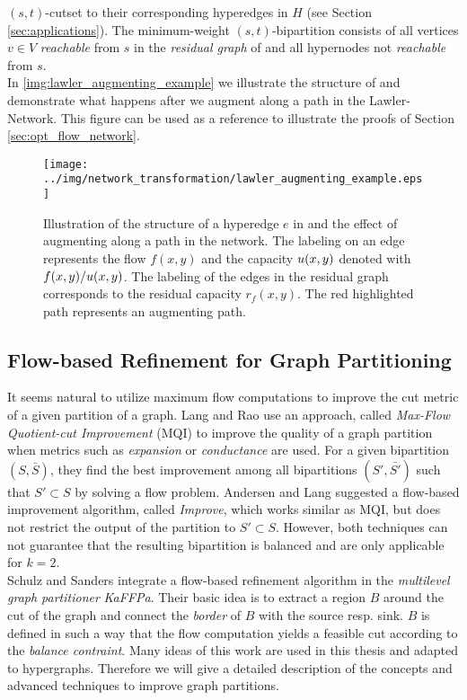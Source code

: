 $(s,t)$-cutset to their corresponding hyperedges in $H$ (see Section \ref{sec:applications}). 
The minimum-weight $(s,t)$-bipartition consists of all vertices $v \in V$ \emph{reachable} from $s$ in the 
\emph{residual graph} of  and all hypernodes not \emph{reachable}
from $s$. \\ 
In \autoref{img:lawler_augmenting_example} we illustrate the structure of  and demonstrate
what happens after we augment along a path in the Lawler-Network. This figure can be used as
a reference to illustrate the proofs of Section \ref{sec:opt_flow_network}.\\
\begin{figure}[t!]
\centering
\texttt{[image: ../img/network\_transformation/lawler\_augmenting\_example.eps]}
\caption{Illustration of the structure of a hyperedge $e$ in  and the effect of augmenting
         along a path in the network. The labeling on an edge represents the flow $f(x,y)$ and
         the capacity $u(x,y)$ denoted with $f(x,y)/u(x,y)$. The labeling of the
         edges in the residual graph corresponds to the residual capacity $r_f(x,y)$. The red highlighted
         path represents an augmenting path.}
\label{img:lawler_augmenting_example} 
\end{figure}


\subsection{Flow-based Refinement for Graph Partitioning}
\label{sec:flow_local_search_graph} 

It seems natural to utilize maximum flow computations to improve the cut metric of a 
given partition of a graph. Lang and Rao \cite{lang2004flow} use an approach,
called \emph{Max-Flow Quotient-cut Improvement} (MQI) to improve the quality
of a graph partition when metrics such as \emph{expansion} or \emph{conductance}
are used. For a given bipartition $(S,\bar{S})$, they find the best 
improvement among all bipartitions $(S',\bar{S'})$ such that $S' \subset S$
by solving a flow problem. Andersen and Lang \cite{andersen2008algorithm}
suggested a flow-based improvement algorithm, called \emph{Improve},
which works similar as MQI, but does not restrict the output of the 
partition to $S' \subset S$. However, both techniques can not guarantee 
that the resulting bipartition is balanced and are only applicable for $k=2$. \\
Schulz and Sanders \cite{sanders2011engineering} integrate a flow-based refinement algorithm 
in the \emph{multilevel graph partitioner} \emph{KaFFPa}. Their basic idea is
to extract a region $B$ around the cut of the graph and connect the \emph{border} 
of $B$ with the source resp. sink. $B$ is defined in such a way that the flow computation
yields a feasible cut according to the \emph{balance contraint}. Many ideas of this work are used in this
thesis and adapted to hypergraphs. Therefore we will give a detailed description
of the concepts and advanced techniques to improve graph partitions.

